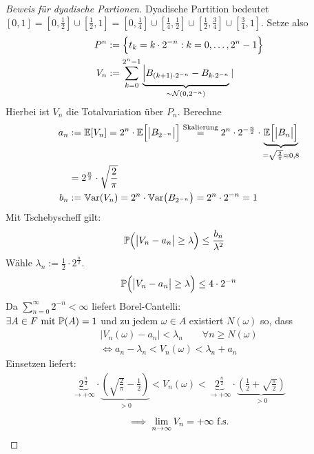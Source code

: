 \begin{proof}[Beweis für dyadische Partionen]\enter
	Dyadische Partition bedeutet $[0,1]=[0,\frac{1}{2}]\cup[\frac{1}{2},1]=[0,\frac{1}{4}]\cup[\frac{1}{4},\frac{1}{2}]\cup[\frac{1}{2},\frac{3}{4}]\cup[\frac{3}{4},1]$.
	Setze also 
	\begin{align*}
		P^n&:=\Big\lbrace t_k=k\cdot 2^{-n}:k=0,\ldots,2^{n}-1\Big\rbrace\\
		V_n&:=\sum\limits_{k=0}^{2^n-1}\underbrace{\Big|B_{(k+1)\cdot 2^{-n}}-B_{k\cdot 2^{-n}}}_{\sim\Nor(0,2^{-n})}|
	\end{align*}
	Hierbei ist $V_n$ die Totalvariation über $P_n$.
	Berechne
	\begin{align*}
		a_n&:=\E[V_n]
		=2^n\cdot\E\Big[\big|B_{2^{-n}}\big|\Big]
		\overset{\text{Skalierung}}=
		2^n\cdot 2^{-\frac{n}{2}}\cdot\underbrace{\E\Big[\big|B_n\big|\Big]}_{=\sqrt{\frac{2}{\pi}}\approx0,8}\\
		&=2^{\frac{n}{2}}\cdot\sqrt{\frac{2}{\pi}}\\
		b_n&:=\Var(V_n)
		=2^n\cdot\Var\big(B_{2^{-n}}\big)
		=2^n\cdot 2^{-n}
		=1
	\end{align*}
	Mit Tschebyscheff gilt:
	\begin{align*}
		\P\Big(\big|V_n-a_n\big|\geq\lambda\Big)
		&\leq\frac{b_n}{\lambda^2}
	\end{align*}
	Wähle $\lambda_n:=\frac{1}{2}\cdot 2^{\frac{n}{2}}$.
	\begin{align*}
		\P\Big(\big|V_n-a_n\big|\geq\lambda\Big)\leq 4\cdot 2^{-n}
	\end{align*}
	Da $\sum\limits_{n=0}^\infty 2^{-n}<\infty$ liefert Borel-Cantelli:\\
	$\exists A\in F\mit\P(A)=1$ und zu jedem $\omega\in A$ existiert $N(\omega)$ so, dass
	\begin{align*}
		\big|V_n(\omega)-a_n\big|<\lambda_n\qquad\forall n\geq N(\omega)\\
		\Longleftrightarrow a_n-\lambda_n<V_n(\omega)<\lambda_n+a_n
	\end{align*}
	Einsetzen liefert:
	\begin{align*}
		\underbrace{2^{\frac{n}{2}}}_{\to+\infty}\cdot\underbrace{\left(\sqrt{\frac{2}{\pi}}-\frac{1}{2}\right)}_{>0}<V_n(\omega)<\underbrace{2^{\frac{n}{2}}}_{\to+\infty}\cdot\underbrace{\left(\frac{1}{2}+\sqrt{\frac{\pi}{2}}\right)}_{>0}
	\end{align*}
	\begin{align*}
		\implies \limn V_n=+\infty\text{ f.s.}
	\end{align*}
\end{proof}

